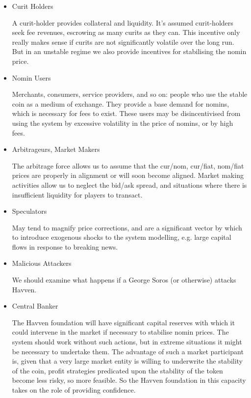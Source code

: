 \begin{itemize}
	\item{Curit Holders}

	A curit-holder provides collateral and liquidity. It’s assumed curit-holders seek fee revenues,
	escrowing as many curits as they can. This incentive only really makes sense if curits are not
	significantly volatile over the long run. But in an unstable regime we also provide incentives
	for stabilising the nomin price. 

	\item{Nomin Users}

	Merchants, consumers, service providers, and so on: people who use the stable coin as a
	medium of exchange. They provide a base demand for nomins, which is necessary for fees
	to exist. These users may be disincentivised from using the system by excessive volatility
	in the price of nomins, or by high fees.

	\item{Arbitrageurs, Market Makers}

	The arbitrage force allows us to assume that the cur/nom, cur/fiat, nom/fiat
	prices are properly in alignment or will soon become aligned. Market making activities
	allow us to neglect the bid/ask spread, and situations where there is insufficient
	liquidity for players to transact.
	
	\item{Speculators}
	
	May tend to magnify price corrections, and are a significant vector by which to introduce
	exogenous shocks to the system modelling, e.g. large capital flows in response to breaking news.
	
	\item{Malicious Attackers}
	
	We should examine what happens if a George Soros (or otherwise) attacks Havven.

	\item{Central Banker}
	
	The Havven foundation will have significant capital reserves with which it could intervene
	in the market if necessary to stabilise nomin prices. The system should work without
	such actions, but in extreme situations it might be necessary to undertake them.
	The advantage of such a market participant is, given that a very large market entity is
	willing to underwrite the stability of the coin, profit strategies predicated upon the
	stability of the token become less risky, so more feasible. So the Havven foundation in
	this capacity takes on the role of providing confidence.

\end{itemize}



\pagebreak